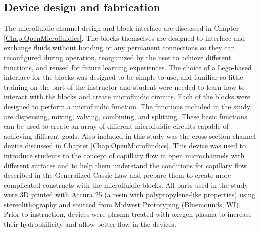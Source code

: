 \subsection{Device design and fabrication}
The microfluidic channel design and block interface are discussed in Chapter \ref{Chap:OpenMicrofluidics}. The blocks themselves are designed to interface and exchange fluids without bonding or any permanent connections so they can reconfigured during operation, reorganized by the user to achieve different functions, and reused for future learning experiences. The choice of a Lego-based interface for the  blocks was designed to be simple to use, and familiar so little training on the part of the instructor and student were needed to learn how to interact with the blocks and create microfluidic circuits. Each of the blocks were designed to perform a microfluidic function. The functions included in the study are dispensing, mixing, valving, combining, and splitting. These basic functions can be used to create an array of different microfluidic circuits capable of achieving different goals. 
Also included in this study was the cross section channel device discussed in Chapter \ref{Chap:OpenMicrofluidics}. This device was used to introduce students to the concept of capillary flow in open microchannels with different surfaces and to help them understand the conditions for capillary flow described in the Generalized Cassie Law \cite{Casavant2013, Berthier2015ASection} and prepare them to create more complicated constructs with the microfluidic blocks.
All parts used in the study were 3D printed with Accura 25 (a resin with polypropylene-like properties) using stereolithography and sourced from Midwest Prototyping (Bluemounds, WI). Prior to instruction, devices were plasma treated with oxygen plasma to increase their hydrophilicity and allow better flow in the devices.

